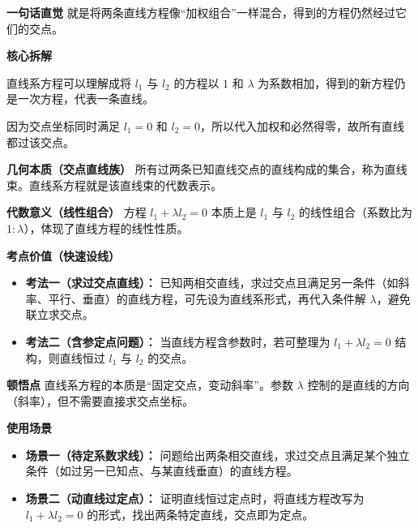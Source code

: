 \begin{explanationbox}
	\textbf{\textcolor{CExplanation}{一句话直觉}}
	就是将两条直线方程像“加权组合”一样混合，得到的方程仍然经过它们的交点。

	\medskip
	\textbf{\textcolor{CExplanation}{核心拆解}}
	\begin{description}[style=nextline, leftmargin=2.8em, labelsep=0.5em, itemsep=0.45em]
		\item[\textbf{要点一（加权组合）：}]
			直线系方程可以理解成将 $l_1$ 与 $l_2$ 的方程以 $1$ 和 $\lambda$ 为系数相加，得到的新方程仍是一次方程，代表一条直线。
		\item[\textbf{要点二（过定点保证）：}]
			因为交点坐标同时满足 $l_1=0$ 和 $l_2=0$，所以代入加权和必然得零，故所有直线都过该交点。
	\end{description}

	\medskip
	\textbf{\textcolor{CExplanation}{几何本质（交点直线族）}}
	所有过两条已知直线交点的直线构成的集合，称为直线束。直线系方程就是该直线束的代数表示。

	\medskip
	\textbf{\textcolor{CExplanation}{代数意义（线性组合）}}
	方程 $l_1+\lambda l_2=0$ 本质上是 $l_1$ 与 $l_2$ 的线性组合（系数比为 $1:\lambda$），体现了直线方程的线性性质。

	\medskip
	\textbf{\textcolor{CExplanation}{考点价值（快速设线）}}
	\begin{itemize}[leftmargin=*, itemsep=0.5em, topsep=0.4em]
		\item \textbf{考法一（求过交点直线）：} 已知两相交直线，求过交点且满足另一条件（如斜率、平行、垂直）的直线方程，可先设为直线系形式，再代入条件解 $\lambda$，避免联立求交点。
		\item \textbf{考法二（含参定点问题）：} 当直线方程含参数时，若可整理为 $l_1+\lambda l_2=0$ 结构，则直线恒过 $l_1$ 与 $l_2$ 的交点。
	\end{itemize}

	\medskip
	\textbf{\textcolor{CExplanation}{顿悟点}}
	直线系方程的本质是“固定交点，变动斜率”。参数 $\lambda$ 控制的是直线的方向（斜率），但不需要直接求交点坐标。

	\medskip
	\textbf{\textcolor{CExplanation}{使用场景}}
	\begin{itemize}[leftmargin=*, itemsep=0.5em, topsep=0.4em]
		\item \textbf{场景一（待定系数求线）：} 问题给出两条相交直线，求过交点且满足某个独立条件（如过另一已知点、与某直线垂直）的直线方程。
		\item \textbf{场景二（动直线过定点）：} 证明直线恒过定点时，将直线方程改写为 $l_1+\lambda l_2=0$ 的形式，找出两条特定直线，交点即为定点。
	\end{itemize}

\end{explanationbox}
